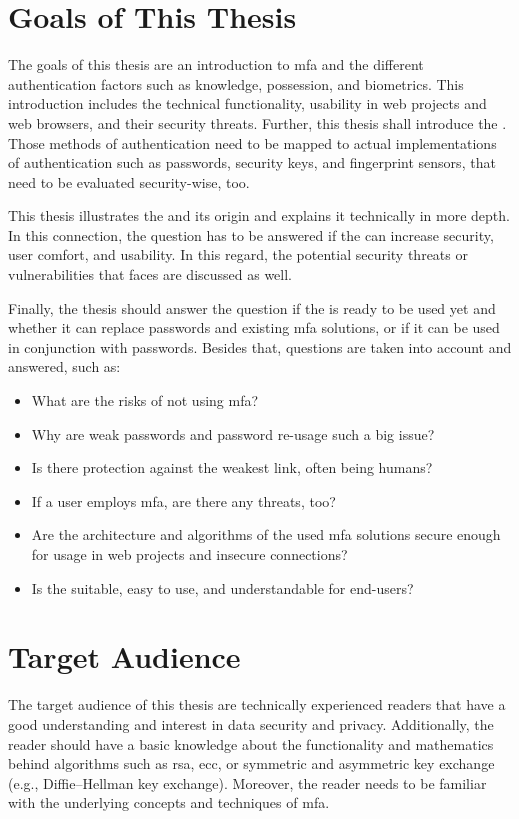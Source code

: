 \section{Goals of This Thesis}
\label{sec:goals}

The goals of this thesis are an introduction to \gls{mfa} and the different authentication factors such as \frqq knowledge, possession, and biometrics\flqq. This introduction includes the technical functionality, usability in web projects and web browsers, and their security threats. Further, this thesis shall introduce the \wa. Those methods of authentication need to be mapped to actual implementations of authentication such as passwords, security keys, and fingerprint sensors, that need to be evaluated security-wise, too.

This thesis illustrates the \wa{} and its origin and explains it technically in more depth. In this connection, the question has to be answered if the \wa{} can increase security, user comfort, and usability. In this regard, the potential security threats or vulnerabilities that \wa{} faces are discussed as well.

Finally, the thesis should answer the question if the \wa{} is ready to be used yet and whether it can replace passwords and existing \gls{mfa} solutions, or if it can be used in conjunction with passwords. Besides that, questions are taken into account and answered, such as:

\begin{itemize}
	\item What are the risks of not using \gls{mfa}?
	\item Why are weak passwords and password re-usage such a big issue?
	\item Is there protection against the weakest link, often being humans?
	\item If a user employs \gls{mfa}, are there any threats, too?
	\item Are the architecture and algorithms of the used \gls{mfa} solutions secure enough for usage in web projects and insecure connections?
	\item Is the \wa{} suitable, easy to use, and understandable for end-users?
\end{itemize}

\section{Target Audience}

The target audience of this thesis are technically experienced readers that have a good understanding and interest in data security and privacy. Additionally, the reader should have a basic knowledge about the functionality and mathematics behind algorithms such as \gls{rsa}, \gls{ecc}, or symmetric and asymmetric key exchange (e.g., Diffie–Hellman key exchange). Moreover, the reader needs to be familiar with the underlying concepts and techniques of \gls{mfa}.

